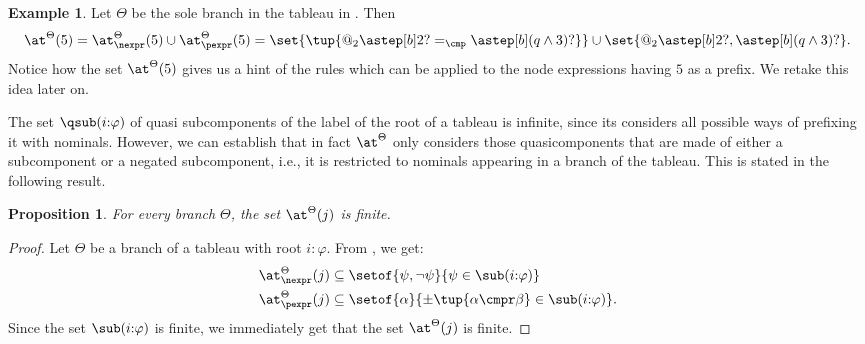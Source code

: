 \documentclass[10pt,a4paper]{amsart}
\newtheorem{prop}[thm]{Proposition}
\theoremstyle{definition}
\newtheorem{exa}[thm]{Example}
\theoremstyle{remark}
\begin{document}
\begin{exa} 
  \label{ex:at}
  Let $\Theta$ be the sole branch in the tableau in .
  Then
$$	      \at^{\Theta}(5) =       {\at_{\nexpr}^{\Theta}(5) \cup \at_{\pexpr}^{\Theta}(5)} =	      {\set{\tup{@_2\astep[b]2? =_\cmp \astep[b](q \land 3)?}} \cup \set{@_2\astep[b]2?,\astep[b](q\land 3)?}}.$$
  Notice how the set $\at^{\Theta}(5)$ gives us a hint of the rules which can be applied to the node expressions having $5$ as a prefix. 
  We retake this idea later on.
\end{exa}

The set $\qsub(i{:}\varphi)$ of quasi subcomponents of the label of the root of a tableau is infinite, since its considers all possible ways of prefixing it with nominals.
However, we can establish that in fact $\at^\Theta$ only considers those  quasicomponents that are made of either a subcomponent or a negated subcomponent, i.e., it is restricted to nominals appearing in a branch of the tableau. This is stated in the following result.

\begin{prop} \label{prop:at:finite}
  For every branch $\Theta$, the set $\at^\Theta(j)$ is finite.
\end{prop}
\begin{proof}
  Let $\Theta$ be a branch of a tableau with root $i{:} \varphi$.
  From , we get: 
  \begin{align*}
    {\at^{\Theta}_{\nexpr}}(j)
      & \subseteq  \setof{\psi, \lnot \psi}{\psi \in \sub(i{:}\varphi) } 
    \\
    \at^{\Theta}_{\pexpr}(j)
      & \subseteq \setof{\alpha}{{\pm}\tup{\alpha \cmpr \beta} \in \sub(i{:}\varphi)}.
  \end{align*}
  Since the set $\sub(i{:}\varphi)$ is finite, we immediately get that the set $\at^\Theta(j)$ is finite.
\end{proof}
\end{document}
